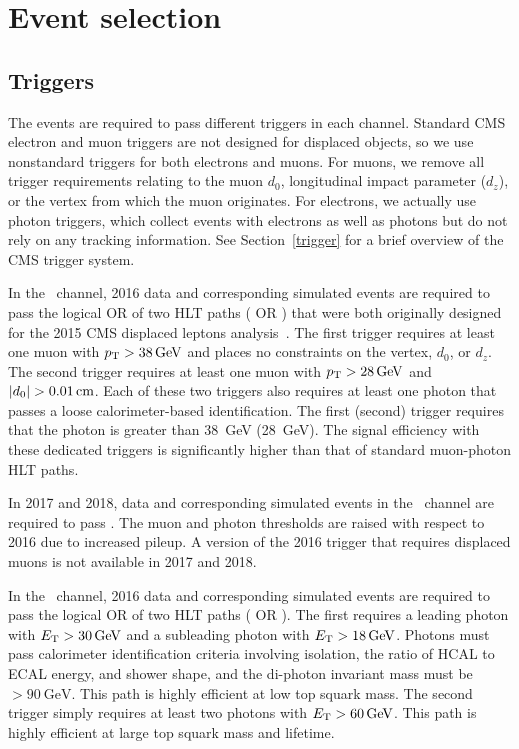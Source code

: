 \section{Event selection}
\label{selection}

\subsection{Triggers}
The events are required to pass different triggers in each channel. Standard CMS electron and muon triggers are not designed for displaced objects, so we use nonstandard triggers for both electrons and muons. For muons, we remove all trigger requirements relating to the muon $d_0$, longitudinal impact parameter ($d_z$), or the vertex from which the muon originates. For electrons, we actually use photon triggers, which collect events with electrons as well as photons but do not rely on any tracking information. See Section~\ref{trigger} for a brief overview of the CMS trigger system.

In the \Pe\Pgm\ channel, 2016 data and corresponding simulated events are required to pass the logical OR of two HLT paths ( OR ) that were both originally designed for the 2015 CMS displaced leptons analysis~\cite{displaced_leptons_bing}. The first trigger requires at least one muon with $\pt>\SI{38}{\GeV}$ and places no constraints on the vertex, $d_0$, or $d_z$. The second trigger requires at least one muon with $\pt>\SI{28}{\GeV}$ and $\ad>\SI{0.01}{\cm}$. Each of these two triggers also requires at least one photon that passes a loose calorimeter-based identification. The first (second) trigger requires that the photon \ET is greater than \SI{38}{\GeV} (\SI{28}{\GeV}). The signal efficiency with these dedicated triggers is significantly higher than that of standard muon-photon HLT paths.

In 2017 and 2018, data and corresponding simulated events in the \Pe\Pgm\ channel are required to pass . The muon \pt and photon \ET thresholds are raised with respect to 2016 due to increased pileup. A version of the 2016 trigger that requires displaced muons is not available in 2017 and 2018.

In the \Pe\Pe\ channel, 2016 data and corresponding simulated events are required to pass the logical OR of two HLT paths ( OR  ). The first requires a leading photon with $E_{\mathrm{T}}>30\,\text{Ge\hspace{-.08em}V}$ and a subleading photon with $\ET>\SI{18}{\GeV}$. Photons must pass calorimeter identification criteria involving isolation, the ratio of HCAL to ECAL energy, and shower shape, and the di-photon invariant mass must be $>\SI{90}{\GeV}$. This path is highly efficient at low top squark mass. The second trigger simply requires at least two photons with $\ET>\SI{60}{\GeV}$. This path is highly efficient at large top squark mass and lifetime.

